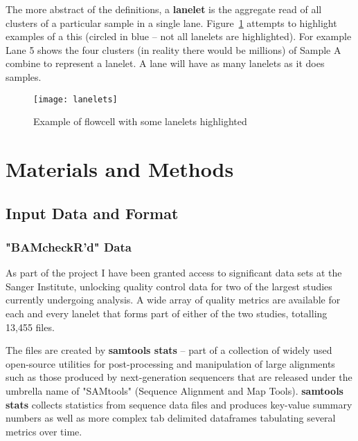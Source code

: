 The more abstract of the definitions, a \textbf{lanelet} is the aggregate read
of all clusters of a particular sample in a single lane.
Figure~\ref{fig:lanelets} attempts to highlight examples of a this (circled in
blue -- not all lanelets are highlighted). For example Lane 5 shows the four
clusters (in reality there would be millions) of Sample A combine to
represent a lanelet. A lane will have as many lanelets as it does samples.


\begin{figure}[htbp!]
    \centering
    \texttt{[image: lanelets]}
    \caption[lanelets]{Example of flowcell with some lanelets highlighted}
    \label{fig:lanelets}
\end{figure}


\chapter{Materials and Methods}
\section{Input Data and Format}
\subsection{"BAMcheckR'd" Data}
\label{chap:bamcheckr-data}

As part of the project I have been granted access to significant data sets at the
Sanger Institute, unlocking quality control data for two of the largest studies
currently undergoing analysis. A wide array of quality metrics are available for
each and every lanelet that forms part of either of the two studies, totalling
13,455 files.


The files are created by \textbf{samtools stats} -- part of a collection of
widely used open-source utilities for post-processing and manipulation of large
alignments such as those produced by next-generation sequencers that are
released under the umbrella name of "SAMtools"\citep{samtools} (Sequence
Alignment and Map Tools). \textbf{samtools stats} collects statistics from
sequence data files and produces key-value summary numbers as well as more
complex tab delimited dataframes tabulating several metrics over time.

